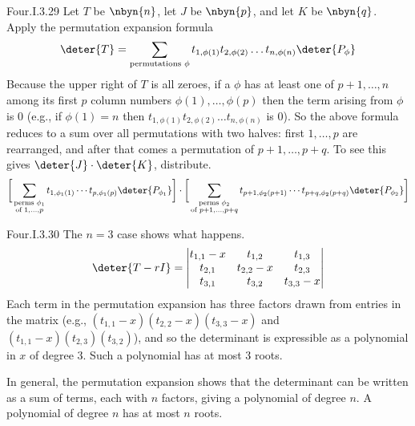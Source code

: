 \begin{ans}{Four.I.3.29}
      Let \( T \) be \( \nbyn{n} \),
      let \( J \) be \( \nbyn{p} \),
      and let \( K \) be \( \nbyn{q} \).
      Apply the permutation expansion formula
      \begin{equation*}
        \deter{T}=
        \sum_{\text{\scriptsize permutations }\phi}
                t_{1,\phi(1)}t_{2,\phi(2)}\dots t_{n,\phi(n)}
                \deter{P_{\phi}}
      \end{equation*}
      Because the upper right of \( T \) is all zeroes, if a
      \( \phi \) has at least one of \( p+1,\dots,n \) among its first
      \( p \) column numbers \( \phi(1),\dots,\phi(p) \) then the term arising
      from \( \phi \) is \( 0 \)
      (e.g., if \( \phi(1)=n \) then
      \( t_{1,\phi(1)}t_{2,\phi(2)}\dots t_{n,\phi(n)} \)
      is \( 0 \)).
      So the above formula reduces to a sum over all permutations
      with two halves:
      first \( 1,\dots,p \) are rearranged, and after that comes
      a permutation of
      \( p+1,\dots,p+q \).
      To see this gives \( \deter{J}\cdot\deter{K}  \), distribute.
      \begin{equation*}
         \bigg[\sum_{\substack{\text{\scriptsize perms }\phi_1 \\
                              \text{\scriptsize of } 1,\dots,p}}
               t_{1,\phi_1(1)}\cdots t_{p,\phi_1(p)}
               \deter{P_{\phi_1}}                            \bigg]\cdot
         \bigg[\sum_{\substack{\text{\scriptsize perms }\phi_2 \\
                              \text{\scriptsize of } p+1,\dots,p+q}}
               t_{p+1,\phi_2(p+1)}\cdots t_{p+q,\phi_2(p+q)}
               \deter{P_{\phi_2}}                          \bigg]
      \end{equation*}
    
\end{ans}
\begin{ans}{Four.I.3.30}
      The $n=3$ case shows what happens.
      \begin{equation*}
        \deter{T-rI}
        =
        \begin{vmatrix}
          t_{1,1}-x  &t_{1,2}   &t_{1,3}  \\
          t_{2,1}    &t_{2,2}-x &t_{2,3}  \\
          t_{3,1}    &t_{3,2}   &t_{3,3}-x
        \end{vmatrix}
      \end{equation*}
      Each term in the permutation expansion has three factors drawn from
      entries in the matrix (e.g., $(t_{1,1}-x)(t_{2,2}-x)(t_{3,3}-x)$
      and $(t_{1,1}-x)(t_{2,3})(t_{3,2})$), and so the determinant is
      expressible as a polynomial in $x$ of degree $3$.
      Such a polynomial has at most $3$ roots.

      In general, the permutation expansion shows that
      the determinant can be written as a sum of terms, each
      with \( n \) factors, giving a polynomial of degree $n$.
      A polynomial of degree \( n \) has at most \( n \) roots.
    
\end{ans}
